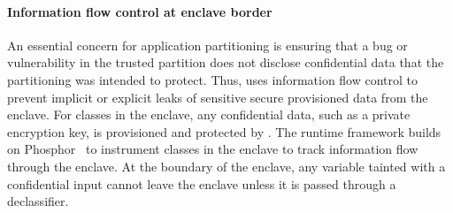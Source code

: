 




\paragraph{Information flow control at enclave border}
An essential concern for application partitioning is ensuring that 
a bug or vulnerability in the trusted partition does not disclose confidential data
that the partitioning was intended to protect.
Thus, \sysname{} uses information flow control to 
prevent implicit or explicit leaks of sensitive secure provisioned data from the enclave.
For classes in the enclave, any confidential data,
such as a private encryption key, is provisioned and protected by \sysname{}.
The \sysname{} runtime framework builds on Phosphor~\cite{bell2014phosphor}
to instrument classes in the enclave to track information flow through the enclave.
At the boundary of the enclave, any variable tainted with a
confidential input cannot leave the enclave unless it is passed through
a declassifier. %

